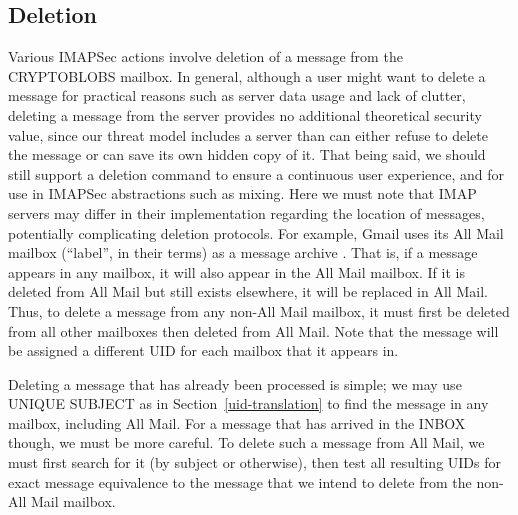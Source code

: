 \documentclass[pageno]{jpaper}
\newcommand{\project}{IMAPSec }
\begin{document}
\subsection{Deletion}
Various \project actions involve deletion of a message from the CRYPTOBLOBS mailbox. In general, although a user might want to delete a message for practical reasons such as server data usage and lack of clutter, deleting a message from the server provides no additional theoretical security value, since our threat model includes a server than can either refuse to delete the message or can save its own hidden copy of it. That being said, we should still support a deletion command to ensure a continuous user experience, and for use in \project abstractions such as mixing. Here we must note that IMAP servers may differ in their implementation regarding the location of messages, potentially complicating deletion protocols. For example, Gmail uses its All Mail mailbox (``label'', in their terms) as a message archive \cite{allmail}. That is, if a message appears in any mailbox, it will also appear in the All Mail mailbox. If it is deleted from All Mail but still exists elsewhere, it will be replaced in All Mail. Thus, to delete a message from any non-All Mail mailbox, it must first be deleted from all other mailboxes then deleted from All Mail. Note that the message will be assigned a different UID for each mailbox that it appears in.

Deleting a message that has already been processed is simple; we may use UNIQUE SUBJECT as in Section~\ref{uid-translation} to find the message in any mailbox, including All Mail. For a message that has arrived in the INBOX though, we must be more careful. To delete such a message from All Mail, we must first search for it (by subject or otherwise), then test all resulting UIDs for exact message equivalence to the message that we intend to delete from the non-All Mail mailbox.
\end{document}
